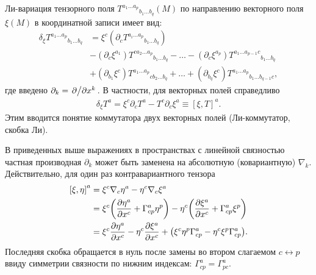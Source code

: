 \documentclass[12pt,a4paper]{article}
\begin{document}
        Ли-вариация тензорного поля ${T^{a_1 \dots a_p}}_{b_1 \dots b_q}(M)$ по направлению векторного поля $\xi(M)$ в координатной записи имеет вид:
        \begin{equation}\begin{aligned}
            \delta_\xi {T^{a_1 \dots a_p}}_{b_1 \dots b_q}
                &= \xi^c \left( \partial_c {T^{a_i \dots a_p}}_{b_1 \dots b_q} \right) \\
                &- \left( \partial_{c} \xi^{a_1} \right) {T^{c a_2 \dots a_p}}_{b_1 \dots b_q} - \dots
                 - \left( \partial_{c} \xi^{a_p} \right) {T^{a_1 \dots a_{p-1} c}}_{b_1 \dots b_q} \\
                &+ \left( \partial_{b_1} \xi^c \right) {T^{a_1 \dots a_p}}_{c b_2 \dots b_q} + \dots
                 + \left( \partial_{b_q} \xi^c \right) {T^{a_1 \dots a_p}}_{b_1 \dots b_{q-1} c} ,
        \end{aligned}\end{equation}
        где введено $\partial_k = \pdv*{x^k}$. В частности, для векторных полей справедливо
        \begin{equation}\begin{aligned}\label{eq:vector_field_commutator}
            \delta_\xi T^a
                = \xi^c \partial_c T^a - T^c \partial_{c} \xi^a
                \equiv [\xi, T]^a.
        \end{aligned}\end{equation}
        Этим вводится понятие коммутатора двух векторных полей (Ли-коммутатор, скобка Ли).

        В приведенных выше выражениях в пространствах с линейной связностью частная производная $\partial_k$ может быть заменена на абсолютную (ковариантную) $\nabla_k$. Действительно, для один раз контравариантного тензора
        \begin{equation}\begin{aligned}
            \qty[\xi, \eta]^a
                &= \xi^c \nabla_c \eta^a - \eta^c \nabla_{c} \xi^a \\
                &= \xi^c \qty( \pdv{\eta^a}{x^c} + \Gamma_{cp}^a \eta^p )
                    - \eta^c \qty( \pdv{\xi^a}{x^c} + \Gamma_{cp}^a \xi^p ) \\
                &= \xi^c \pdv{\eta^a}{x^c} - \eta^c \pdv{\xi^a}{x^c}
                    + \qty( \xi^c \eta^p \Gamma_{cp}^a - \eta^c \xi^p \Gamma_{cp}^a ) .
        \end{aligned}\end{equation}
        Последняя скобка обращается в нуль после замены во втором слагаемом $c \leftrightarrow p$ ввиду симметрии связности по нижним индексам: $\Gamma_{cp}^a = \Gamma_{pc}^a$.
\end{document}
